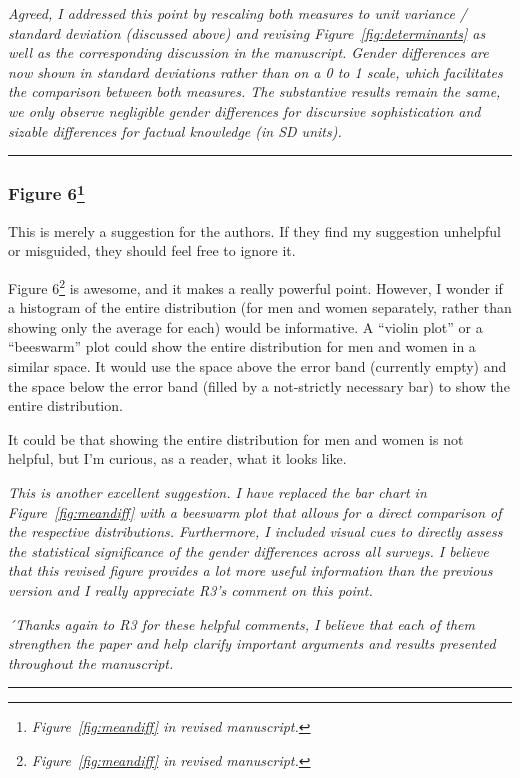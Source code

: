 \textit{Agreed, I addressed this point by rescaling both measures to unit variance / standard deviation (discussed above) and revising Figure~\ref{fig:determinants} as well as the corresponding discussion in the manuscript. Gender differences are now shown in standard deviations rather than on a 0 to 1 scale, which facilitates the comparison between both measures. The substantive results remain the same, we only observe negligible gender differences for discursive sophistication and sizable differences for factual knowledge (in SD units).}


\rule{\linewidth}{.01cm}


\subsubsection*{Figure 6\footnote{\textit{Figure~\ref{fig:meandiff} in revised manuscript.}}}

This is merely a suggestion for the authors. If they find my suggestion unhelpful or misguided, they should feel free to ignore it.

Figure 6\footnote{\textit{Figure~\ref{fig:meandiff} in revised manuscript.}} is awesome, and it makes a really powerful point. However, I wonder if a histogram of the entire distribution (for men and women separately, rather than showing only the average for each) would be informative. A ``violin plot'' or a ``beeswarm'' plot could show the entire distribution for men and women in a similar space. It would use the space above the error band (currently empty) and the space below the error band (filled by a not-strictly necessary bar) to show the entire distribution.

It could be that showing the entire distribution for men and women is not helpful, but I’m curious, as a reader, what it looks like.

\textit{This is another excellent suggestion. I have replaced the bar chart in Figure~\ref{fig:meandiff} with a beeswarm plot that allows for a direct comparison of the respective distributions. Furthermore, I included visual cues to directly assess the statistical significance of the gender differences across all surveys. I believe that this revised figure provides a lot more useful information than the previous version and I really appreciate R3's comment on this point.}

\textit{´Thanks again to R3 for these helpful comments, I believe that each of them strengthen the paper and help clarify important arguments and results presented throughout the manuscript.}


\rule{\linewidth}{.01cm}